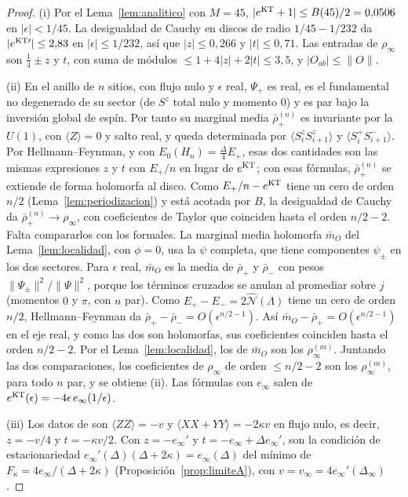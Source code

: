 \documentclass[11pt,a4paper]{article}
\theoremstyle{remark}
\newcommand{\ev}[1]{\langle #1\rangle}
\begin{document}
\begin{proof}
(i) Por el Lema~\ref{lem:analitico} con $M=45$, $|e^{\rm KT}+1|\le B(45)/2=0{,}0506$ en $|\epsilon|<1/45$.
La desigualdad de Cauchy en discos de radio $1/45-1/232$ da $|e^{{\rm KT}\prime}|\le2{,}83$ en
$|\epsilon|\le1/232$, así que $|z|\le0{,}266$ y $|t|\le0{,}71$. Las entradas de $\rho_\infty$ son
$\tfrac14\pm z$ y $t$, con suma de módulos $\le1+4|z|+2|t|\le3{,}5$, y $|O_{ab}|\le\|O\|$.

(ii) En el anillo de $n$ sitios, con flujo nulo y $\epsilon$ real, $\Psi_+$ es real, es el fundamental no
degenerado de su sector (de $S^z$ total nulo y momento $0$) y es par bajo la inversión global de espín.
Por tanto su marginal media $\bar\rho_+^{(n)}$ es invariante por la $U(1)$, con $\ev Z=0$ y salto real, y
queda determinada por $\ev{S^z_iS^z_{i+1}}$ y $\ev{S^+_iS^-_{i+1}}$. Por Hellmann--Feynman, y con
$E_0(H_n)=\tfrac\Delta4E_+$, esas dos cantidades son las mismas expresiones $z$ y $t$ con $E_+/n$ en lugar de
$e^{\rm KT}$; con esas fórmulas, $\bar\rho_+^{(n)}$ se extiende de forma holomorfa al disco. Como
$E_+/n-e^{\rm KT}$ tiene un cero de orden $n/2$ (Lema~\ref{lem:periodizacion}) y está acotada por $B$, la
desigualdad de Cauchy da $\bar\rho^{(n)}_+\to\rho_\infty$, con coeficientes de Taylor que coinciden hasta el
orden $n/2-2$. Falta compararlos con los formales. La marginal media holomorfa $\bar m_O$ del
Lema~\ref{lem:localidad}, con $\phi=0$, usa la $\psi$ completa, que tiene componentes $\psi_\pm$ en los dos
sectores. Para $\epsilon$ real, $\bar m_O$ es la media de $\bar\rho_+$ y $\bar\rho_-$ con pesos
$\|\Psi_\pm\|^2/\|\Psi\|^2$, porque los términos cruzados se anulan al promediar sobre $j$ (momentos $0$ y
$\pi$, con $n$ par). Como $E_+-E_-=2\widehat{\mathcal N}(\Lambda)$ tiene un cero de orden $n/2$, Hellmann--Feynman
da $\bar\rho_+-\bar\rho_-=O(\epsilon^{n/2-1})$. Así $\bar m_O-\bar\rho_+=O(\epsilon^{n/2-1})$ en el eje real, y
como las dos son holomorfas, sus coeficientes coinciden hasta el orden $n/2-2$. Por el
Lema~\ref{lem:localidad}, los de $\bar m_O$ son los $\rho^{(m)}_\infty$. Juntando las dos
comparaciones, los coeficientes de $\rho_\infty$ de orden $\le n/2-2$ son los $\rho^{(m)}_\infty$, para todo
$n$ par, y se obtiene (ii). Las fórmulas
con $e_\infty$ salen de $e^{\rm KT}(\epsilon)=-4\epsilon\,e_\infty(1/\epsilon)$.

(iii) Los datos de \cite[Sec.~6]{robustez} son $\ev{ZZ}=-v$ y $\ev{XX+YY}=-2\kappa v$ en flujo nulo, es decir,
$z=-v/4$ y $t=-\kappa v/2$. Con $z=-e_\infty'$ y $t=-e_\infty+\Delta e_\infty'$, son la condición de
estacionariedad $e_\infty'(\Delta)(\Delta+2\kappa)=e_\infty(\Delta)$ del mínimo de
$F_\kappa=4e_\infty/(\Delta+2\kappa)$ (Proposición~\ref{prop:limiteA}), con $v=v_\infty=4e_\infty'(\Delta_\infty)$.
\end{proof}
\end{document}
